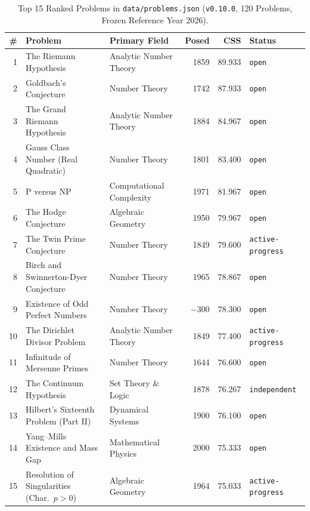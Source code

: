 \documentclass[11pt,reqno]{amsart}
\theoremstyle{plain}
\theoremstyle{definition}
\newcommand{\code}[1]{{\upshape\nolinkurl{#1}}}
\begin{document}
\begin{table}[htbp]
\centering
\caption{Top 15 Ranked Problems in \code{data/problems.json} (\texttt{v0.10.0}, 120 Problems, Frozen Reference Year 2026).}
\label{tab:top15}
\footnotesize
\setlength{\tabcolsep}{4pt}
\begin{tabular}{@{}rllrrl@{}}
\toprule
\# & Problem & Primary Field & Posed & CSS & Status \\
\midrule
 1 & The Riemann Hypothesis & Analytic Number Theory & 1859 & 89.933 & \code{open} \\
 2 & Goldbach's Conjecture & Number Theory & 1742 & 87.933 & \code{open} \\
 3 & The Grand Riemann Hypothesis & Analytic Number Theory & 1884 & 84.967 & \code{open} \\
 4 & Gauss Class Number (Real Quadratic) & Number Theory & 1801 & 83.400 & \code{open} \\
 5 & P versus NP & Computational Complexity & 1971 & 81.967 & \code{open} \\
 6 & The Hodge Conjecture & Algebraic Geometry & 1950 & 79.967 & \code{open} \\
 7 & The Twin Prime Conjecture & Number Theory & 1849 & 79.600 & \code{active-progress} \\
 8 & Birch and Swinnerton-Dyer Conjecture & Number Theory & 1965 & 78.867 & \code{open} \\
 9 & Existence of Odd Perfect Numbers & Number Theory & $-300$ & 78.300 & \code{open} \\
10 & The Dirichlet Divisor Problem & Analytic Number Theory & 1849 & 77.400 & \code{active-progress} \\
11 & Infinitude of Mersenne Primes & Number Theory & 1644 & 76.600 & \code{open} \\
12 & The Continuum Hypothesis & Set Theory \& Logic & 1878 & 76.267 & \code{independent} \\
13 & Hilbert's Sixteenth Problem (Part II) & Dynamical Systems & 1900 & 76.100 & \code{open} \\
14 & Yang--Mills Existence and Mass Gap & Mathematical Physics & 2000 & 75.333 & \code{open} \\
15 & Resolution of Singularities (Char.\ $p>0$) & Algebraic Geometry & 1964 & 75.033 & \code{active-progress} \\
\bottomrule
\end{tabular}
\end{table}
\end{document}
